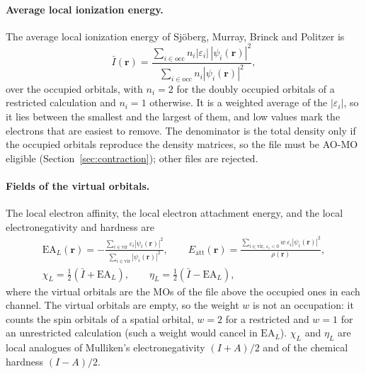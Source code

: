 \documentclass[11pt,a4paper]{article}
\begin{document}
\paragraph{Average local ionization energy.} The average local ionization
energy of Sj\"oberg, Murray, Brinck and Politzer is
\begin{equation}
 \bar I(\mathbf r)=\frac{\sum_{i\in\mathrm{occ}}n_i|\varepsilon_i|\,|\psi_i(\mathbf r)|^2}
 {\sum_{i\in\mathrm{occ}}n_i|\psi_i(\mathbf r)|^2},
\end{equation}
over the occupied orbitals, with $n_i=2$ for the doubly occupied orbitals of
a restricted calculation and $n_i=1$ otherwise. It is a weighted average of
the $|\varepsilon_i|$, so it lies between the smallest and the largest of
them, and low values mark the electrons that are easiest to remove. The
denominator is the total density only if the occupied orbitals reproduce
the density matrices, so the file must be AO-MO eligible
(Section~\ref{sec:contraction}); other files are rejected.

\paragraph{Fields of the virtual orbitals.} The local electron affinity,
the local electron attachment energy, and the local electronegativity and
hardness are
\begin{gather}
 \mathrm{EA}_L(\mathbf r)=-\frac{\sum_{i\in\mathrm{vir}}\varepsilon_i|\psi_i(\mathbf r)|^2}
 {\sum_{i\in\mathrm{vir}}|\psi_i(\mathbf r)|^2},\qquad
 E_{\mathrm{att}}(\mathbf r)=\frac{\sum_{i\in\mathrm{vir},\,\varepsilon_i<0}
 w\,\varepsilon_i|\psi_i(\mathbf r)|^2}{\rho(\mathbf r)},\\
 \chi_L=\tfrac12(\bar I+\mathrm{EA}_L),\qquad \eta_L=\tfrac12(\bar I-\mathrm{EA}_L),
\end{gather}
where the virtual orbitals are the MOs of the file above the occupied ones
in each channel. The virtual orbitals are empty, so the weight $w$ is not
an occupation: it counts the spin orbitals of a spatial orbital, $w=2$ for
a restricted and $w=1$ for an unrestricted calculation (such a weight would
cancel in $\mathrm{EA}_L$).
$\chi_L$ and $\eta_L$ are local analogues of Mulliken's electronegativity
$(I+A)/2$ and of the chemical hardness $(I-A)/2$.
\end{document}
